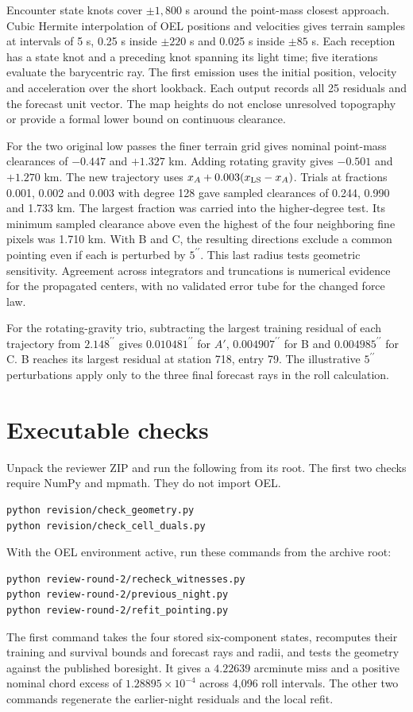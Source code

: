 \documentclass[10pt,letterpaper]{article}
\newcommand{\as}{^{\prime\prime}}
\begin{document}
Encounter state knots cover $\pm1,800$ s around the point-mass closest approach. Cubic Hermite interpolation of OEL positions and velocities gives terrain samples at intervals of 5 s, 0.25 s inside $\pm220$ s and 0.025 s inside $\pm85$ s. Each reception has a state knot and a preceding knot spanning its light time; five iterations evaluate the barycentric ray. The first emission uses the initial position, velocity and acceleration over the short lookback. Each output records all 25 residuals and the forecast unit vector. The map heights do not enclose unresolved topography or provide a formal lower bound on continuous clearance.

For the two original low passes the finer terrain grid gives nominal point-mass clearances of $-0.447$ and $+1.327$ km. Adding rotating gravity gives $-0.501$ and $+1.270$ km. The new trajectory uses $x_A+0.003(x_{\rm LS}-x_A)$. Trials at fractions 0.001, 0.002 and 0.003 with degree 128 gave sampled clearances of 0.244, 0.990 and 1.733 km. The largest fraction was carried into the higher-degree test. Its minimum sampled clearance above even the highest of the four neighboring fine pixels was 1.710 km. With B and C, the resulting directions exclude a common pointing even if each is perturbed by $5\as$. This last radius tests geometric sensitivity. Agreement across integrators and truncations is numerical evidence for the propagated centers, with no validated error tube for the changed force law.

For the rotating-gravity trio, subtracting the largest training residual of each trajectory from $2.148\as$ gives $0.010481\as$ for $A'$, $0.004907\as$ for B and $0.004985\as$ for C. B reaches its largest residual at station 718, entry 79. The illustrative $5\as$ perturbations apply only to the three final forecast rays in the roll calculation.

\section{Executable checks}
Unpack the reviewer ZIP and run the following from its root. The first two checks require NumPy and mpmath. They do not import OEL.
\begin{verbatim}
python revision/check_geometry.py
python revision/check_cell_duals.py
\end{verbatim}
With the OEL environment active, run these commands from the archive root:
\begin{verbatim}
python review-round-2/recheck_witnesses.py
python review-round-2/previous_night.py
python review-round-2/refit_pointing.py
\end{verbatim}
The first command takes the four stored six-component states, recomputes their training and survival bounds and forecast rays and radii, and tests the geometry against the published boresight. It gives a $4.22639$ arcminute miss and a positive nominal chord excess of $1.28895\times10^{-4}$ across 4,096 roll intervals. The other two commands regenerate the earlier-night residuals and the local refit.
\end{document}
